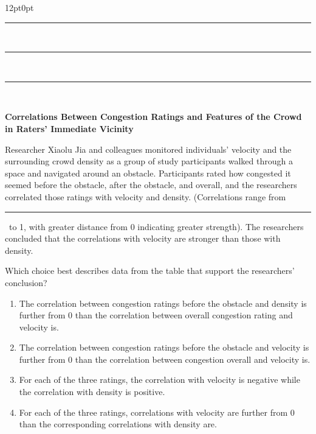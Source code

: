 \documentclass[11pt, twocolumn]{article}
\newcounter{questionnum}
\begin{document}
\vspace{6pt}\noindent
\begin{minipage}{\columnwidth}\raggedright
\noindent{}\par\vspace{8pt}
\begin{adjustwidth}{12pt}{0pt}
\,\rule{2cm}{0.4pt}\,\,\rule{2cm}{0.4pt}\,\,\rule{2cm}{0.4pt}\,

\begin{center}
\textbf{Correlations Between Congestion Ratings and Features of the Crowd in Raters' Immediate Vicinity}
\end{center}
\noindent{}

Researcher Xiaolu Jia and colleagues monitored individuals' velocity and the surrounding crowd density as a group of study participants walked through a space and navigated around an obstacle. Participants rated how congested it seemed before the obstacle, after the obstacle, and overall, and the researchers correlated those ratings with velocity and density. (Correlations range from \,\rule{2cm}{0.4pt}\, to 1, with greater distance from 0 indicating greater strength). The researchers concluded that the correlations with velocity are stronger than those with density.
\vspace{6pt}

Which choice best describes data from the table that support the researchers' conclusion?
\begin{enumerate}[label=\Alph*),leftmargin=18pt,topsep=3pt,itemsep=2pt]
  \item The correlation between congestion ratings before the obstacle and density is further from 0 than the correlation between overall congestion rating and velocity is.
  \item The correlation between congestion ratings before the obstacle and velocity is further from 0 than the correlation between congestion overall and velocity is.
  \item For each of the three ratings, the correlation with velocity is negative while the correlation with density is positive.
  \item For each of the three ratings, correlations with velocity are further from 0 than the corresponding correlations with density are.
\end{enumerate}
\end{adjustwidth}
\end{minipage}\par
\end{document}
